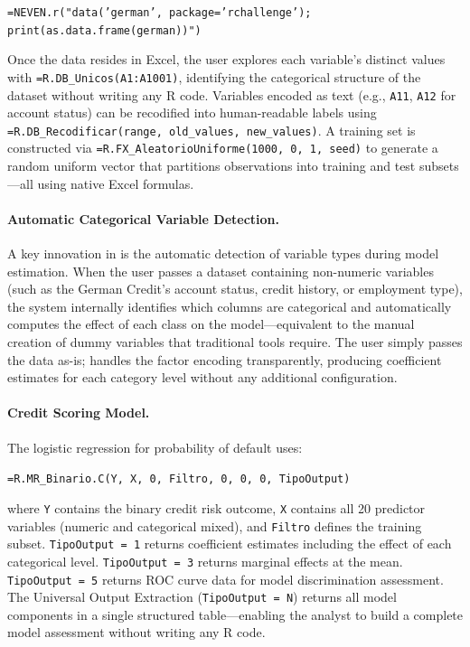 \begin{center}
\texttt{=NEVEN.r("data('german', package='rchallenge'); print(as.data.frame(german))")}
\end{center}

Once the data resides in Excel, the user explores each variable's distinct values with \texttt{=R.DB\_Unicos(A1:A1001)}, identifying the categorical structure of the dataset without writing any R code. Variables encoded as text (e.g., \texttt{A11}, \texttt{A12} for account status) can be recodified into human-readable labels using \texttt{=R.DB\_Recodificar(range, old\_values, new\_values)}. A training set is constructed via \texttt{=R.FX\_AleatorioUniforme(1000, 0, 1, seed)} to generate a random uniform vector that partitions observations into training and test subsets---all using native Excel formulas.

\paragraph{Automatic Categorical Variable Detection.}
A key innovation in \neven{} is the automatic detection of variable types during model estimation. When the user passes a dataset containing non-numeric variables (such as the German Credit's account status, credit history, or employment type), the system internally identifies which columns are categorical and automatically computes the effect of each class on the model---equivalent to the manual creation of dummy variables that traditional tools require. The user simply passes the data as-is; \neven{} handles the factor encoding transparently, producing coefficient estimates for each category level without any additional configuration.

\paragraph{Credit Scoring Model.}
The logistic regression for probability of default uses:

\begin{center}
\texttt{=R.MR\_Binario.C(Y, X, 0, Filtro, 0, 0, 0, TipoOutput)}
\end{center}

where \texttt{Y} contains the binary credit risk outcome, \texttt{X} contains all 20 predictor variables (numeric and categorical mixed), and \texttt{Filtro} defines the training subset. \texttt{TipoOutput = 1} returns coefficient estimates including the effect of each categorical level. \texttt{TipoOutput = 3} returns marginal effects at the mean. \texttt{TipoOutput = 5} returns ROC curve data for model discrimination assessment. The Universal Output Extraction (\texttt{TipoOutput = N}) returns all model components in a single structured table---enabling the analyst to build a complete model assessment without writing any R code.

